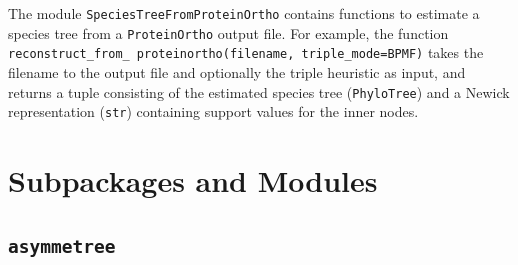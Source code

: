 \documentclass[hidelinks,11pt]{article}
\newcommand{\sq}{\textquotesingle}
\begin{document}
The module \texttt{SpeciesTreeFromProteinOrtho} contains functions to estimate
a species tree from a \texttt{ProteinOrtho} \citep{lechner2011} output file.
For example, the function \texttt{reconstruct\_from\_ proteinortho(filename,
triple\_mode=\sq BPMF\sq)} takes the filename to the output file and optionally
the triple heuristic as input, and returns a tuple consisting of the estimated
species tree (\texttt{PhyloTree}) and a Newick representation (\texttt{str})
containing support values for the inner nodes.




\newpage


\appendix

\section{Subpackages and Modules}\label{apx:package_structure}

\subsection{\texttt{asymmetree}}
\end{document}

